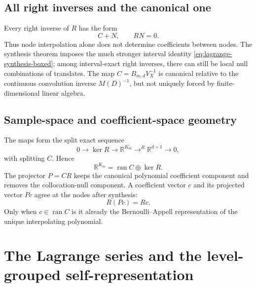 \documentclass[11pt,oneside]{book}
\theoremstyle{definition}
\theoremstyle{remark}
\DeclareMathOperator{\ran}{ran}
\newcommand{\R}{\mathbb R}
\begin{document}
\section{All right inverses and the canonical one}
Every right inverse of \(R\) has the form
\begin{equation}
 C+N,
 \qquad RN=0.
 \label{eq:all-right-inverses}
\end{equation}
Thus node interpolation alone does not determine coefficients between nodes.  The synthesis theorem imposes the much stronger interval identity \cref{eq:lagrange-synthesis-boxed}; among interval-exact right inverses, there can still be local null combinations of translates.  The map \(C=B_{m,d}V_X^{-1}\) is canonical relative to the continuous convolution inverse \(M(D)^{-1}\), but not uniquely forced by finite-dimensional linear algebra.

\section{Sample-space and coefficient-space geometry}
The maps form the split exact sequence
\begin{equation}
 0\longrightarrow\ker R
 \longrightarrow\R^{K_m}
 \mathop{\longrightarrow}^{R}\R^{d+1}
 \longrightarrow0,
 \label{eq:split-sequence}
\end{equation}
with splitting \(C\).  Hence
\begin{equation}
 \R^{K_m}=\ran C\oplus\ker R.
 \label{eq:direct-sum}
\end{equation}
The projector \(P=CR\) keeps the canonical polynomial coefficient component and removes the collocation-null component.  A coefficient vector \(c\) and its projected vector \(Pc\) agree at the nodes after synthesis:
\begin{equation}
 R(Pc)=Rc.
 \label{eq:projected-same-data}
\end{equation}
Only when \(c\in\ran C\) is it already the Bernoulli--Appell representation of the unique interpolating polynomial.

\chapter{The Lagrange series and the level-grouped self-representation}
\label{ch:series-loop}
\end{document}
